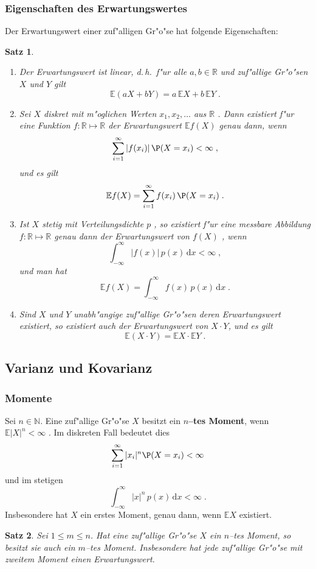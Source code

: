 \documentclass[ngerman,draft,parskip=half,twoside]{scrartcl}
\newtheorem{thm}{Satz}[section]
\newcommand*{\R}{\mathbb{R}}      %
\newcommand*{\N}{\mathbb{N}}      %
\newcommand*{\E}{\mathbb{E}}        %
\begin{document}
\subsubsection{Eigenschaften des Erwartungswertes}
Der Erwartungswert einer zuf"alligen Gr"o"se hat folgende Eigenschaften$\colon$
\begin{thm}~
\begin{enumerate}
\item
Der Erwartungswert ist linear, d.\,h.~f"ur alle $a,b\in\R$ und zuf"allige Gr"o"sen $X$ und $Y$
gilt
$$
\E(a X+ b Y) = a\,\E X + b\, \E Y\;.
$$
\item
Sei  $X$ diskret mit m"oglichen Werten $x_1,x_2,\ldots$ aus $\R$ .
Dann existiert f"ur eine Funktion $f \colon\R\mapsto\R$
der Erwartungswert $\E f(X)$ genau dann, wenn
$$
\sum_{i=1}^\infty |f(x_i)|\,\P(X=x_i)<\infty\;,
$$
und es gilt
$$
\E f(X)=\sum_{i=1}^\infty f(x_i)\,\P(X=x_i)\;.
$$
\item
Ist $X$ stetig mit Verteilungsdichte $p$ , so existiert f"ur eine messbare
Abbildung $f \colon\R\mapsto\R$ genau dann der Erwartungswert von $f(X)$ , wenn
$$
\int_{-\infty}^\infty |f(x)|\,p(x)\,\mathrm d x<\infty\;,
$$
und man hat
$$
\E f(X)=\int_{-\infty}^\infty  f(x) \,p(x)\,\mathrm d x\;.
$$
\item
Sind $X$ und $Y$ unabh"angige zuf"allige Gr"o"sen deren Erwartungswert existiert,
so existiert auch der Erwartungswert von $X\cdot Y$, und es gilt
$$
\E(X\cdot Y)= \E X \cdot \E Y\;.
$$
\end{enumerate}
\end{thm}

\subsection{Varianz und Kovarianz}
\subsubsection{Momente}
Sei $n\in\N$. Eine zuf"allige Gr"o"se $X$ besitzt ein \textbf{$n$--tes Moment}, wenn
$\E|X|^n<\infty$ . Im diskreten Fall bedeutet dies
$$
\sum_{i=1}^\infty |x_i|^n\P(X=x_i)<\infty
$$
und im stetigen
$$
\int_{-\infty}^\infty |x|^n\,p(x)\,\mathrm d x<\infty\;.
$$
Insbesondere hat $X$ ein erstes Moment, genau dann, wenn $\E X$ existiert.
\begin{thm}
Sei $1\le m\le n$. Hat eine zuf"allige Gr"o"se $X$ ein $n$--tes Moment, so besitzt sie auch ein $m$--tes Moment.
Insbesondere hat jede zuf"allige Gr"o"se mit zweitem Moment einen Erwartungswert.
\end{thm}
\end{document}
